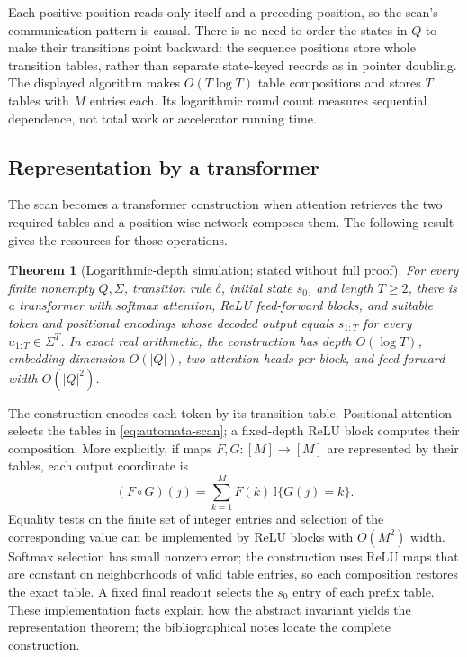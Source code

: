 \documentclass[11pt,twoside]{article}
\newcommand{\I}{\mathbb I}
\newtheorem{theorem}{Theorem}[section]
\theoremstyle{definition}
\theoremstyle{remark}
\begin{document}
Each positive position reads only itself and a preceding position, so the
scan's communication pattern is causal. There is no need to order the
states in \(Q\) to make their transitions point backward: the sequence
positions store whole transition tables, rather than separate state-keyed
records as in pointer doubling.
The displayed algorithm makes \(O(T\log T)\) table compositions and stores
\(T\) tables with \(M\) entries each. Its logarithmic round count measures
sequential dependence, not total work or accelerator running time.

\subsection{Representation by a transformer}

The scan becomes a transformer construction when attention retrieves the
two required tables and a position-wise network composes them.
The following result gives the resources for those operations.

\begin{theorem}[Logarithmic-depth simulation; stated without full proof]
\label{thm:automata-transformer}
For every finite nonempty \(Q,\Sigma\), transition rule \(\delta\),
initial state \(s_0\), and length \(T\geq2\), there is a transformer
with softmax attention, ReLU feed-forward blocks, and suitable token and
positional encodings whose decoded output equals \(s_{1:T}\) for every
\(u_{1:T}\in\Sigma^T\). In exact real arithmetic, the construction has
depth \(O(\log T)\), embedding dimension \(O(|Q|)\), two attention
heads per block, and feed-forward width \(O(|Q|^2)\).
\end{theorem}

The construction encodes each token by its transition table. Positional
attention selects the tables in \eqref{eq:automata-scan}; a fixed-depth
ReLU block computes their composition. More explicitly, if maps
\(F,G:[M]\to[M]\) are represented by their tables, each output coordinate is
\[
 (F\circ G)(j)=\sum_{k=1}^M F(k)\,\I\{G(j)=k\}.
\]
Equality tests on the finite set of integer entries and selection of the
corresponding value can be implemented by ReLU blocks with \(O(M^2)\)
width. Softmax selection has small nonzero error; the construction uses
ReLU maps that are constant on neighborhoods of valid table entries,
so each composition restores the exact table.
A fixed final readout selects the \(s_0\) entry of each prefix table.
These implementation facts explain how the
abstract invariant yields the representation theorem; the bibliographical
notes locate the complete construction.
\end{document}
